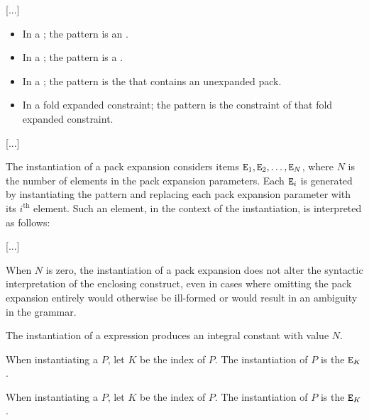 \documentclass{wg21}
\begin{document}
[...]

\begin{itemize}

\item In a ;
the pattern is an .

\item In a ;
the pattern is a .


\item In a ;
the pattern is the 
that contains an unexpanded pack.

\item In a fold expanded constraint;
the pattern is the constraint of that fold expanded constraint.
\end{itemize}


[...]

\pnum
The instantiation of a pack expansion considers
items $\texttt{E}_1, \texttt{E}_2, \dotsc, \texttt{E}_N$,
where
$N$ is the number of elements in the pack expansion parameters.
Each $\texttt{E}_i$ is generated by instantiating the pattern and
replacing each pack expansion parameter with its $i^\text{th}$ element.
Such an element, in the context of the instantiation, is interpreted as
follows:

[...]

When $N$ is zero, the instantiation of a pack expansion
does not alter the syntactic interpretation of the enclosing construct,
even in cases where omitting the pack expansion entirely would
otherwise be ill-formed or would result in an ambiguity in the grammar.

\pnum
The instantiation of a  expression produces
an integral constant with value $N$.

\pnum
When instantiating a  $P$,
let $K$ be the index of $P$.
The instantiation of $P$ is the  $\texttt{E}_K$.

\pnum
When instantiating a  $P$,
let $K$ be the index of $P$.
The instantiation of $P$ is the  $\texttt{E}_K$.
\end{document}
